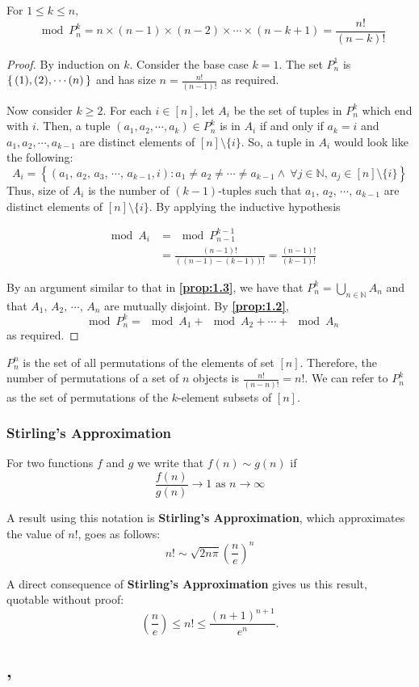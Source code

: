 \documentclass[a4paper]{article}
\begin{document}
	\begin{proposition}
		For $1 \leq k \leq n,$ \[\mod{P^k_n} = n \times (n-1) \times (n-2) \times \cdots \times (n-k+1) = \frac{n!}{(n-k)!}\]
	\end{proposition}
	
	\begin{proof}
		By induction on $k$. Consider the base case $k=1$. The set $P^1_n$ is $\set{(1),(2),\cdots (n)}$ and has size $n = \frac{n!}{(n-1)!}$ as required.
		
		Now consider $k \geq 2$. For each $i\in [n]$, let $A_i$ be the set of tuples in $P^k_n$ which end with $i$. Then, a tuple $(a_1, a_2, \cdots, a_k) \in P^k_n$ is in $A_i$ if and only if $a_k = i$ and $a_1, a_2, \cdots, a_{k-1}$ are distinct elements of $[n]\setminus\{i\}$. So, a tuple in $A_i$ would look like the following: \[A_i = \left\{\left(a_1,\, a_2,\, a_3,\, \cdots,\, a_{k-1}, i\right): a_1\neq a_2  \neq \cdots \neq a_{k-1} \wedge\ \forall j\in \mathbb N,\, a_j \in [n]\setminus\{i\}\right\}\] Thus, size of $A_i$ is the number of $(k-1)$-tuples such that $a_1,\,a_2,\,\cdots,\, a_{k-1}$ are distinct elements of $[n]\setminus\{i\}$. By applying the inductive hypothesis
		
		\begin{align*}
			\mod{A_i} &= \mod{P^{k-1}_{n-1}}\\
					  &= \frac{(n-1)!}{\left((n-1)-(k-1)\right)!} = \frac{(n-1)!}{(k-1)!}
		\end{align*}
		
		By an argument similar to that in \textbf{\autoref{prop:1.3}}, we have that $P^k_n = \bigcup_{n\in\mathbb N} A_n$ and that $A_1,\, A_2,\, \cdots,\, A_n$ are mutually disjoint. By \textbf{\autoref{prop:1.2}}, \[\mod{P^k_n}  = \mod{A_1} + \mod{A_2} + \cdots + \mod{A_n}\] as required.
	\end{proof}

	\begin{note}
		$P^n_n$ is the set of all permutations of the elements of set $[n]$. Therefore, the number of permutations of a set of $n$ objects is $\frac{n!}{(n-n)!} = n!$. We can refer to $P^k_n$ as the set of permutations of the $k$-element subsets of $[n]$.
	\end{note}
	
	\subsubsection{Stirling's Approximation}
	
	For two functions $f$ and $g$ we write that $f(n) \sim g(n)$ if \[\frac{f(n)}{g(n)} \to 1 \text{ as } n\to \infty\]
	
	A result using this notation is \textbf{Stirling's Approximation}, which approximates the value of $n!$, goes as follows: \[n! \sim \sqrt{2n\pi}\left(\frac{n}{e}\right)^n\]
	
	A direct consequence of \textbf{Stirling's Approximation} gives us this result, quotable without proof:
	 \[\left(\frac{n}{e}\right) \leq n! \leq \frac{(n+1)^{n+1}}{e^{n}}.\]

     \subsection{, }
\end{document}
